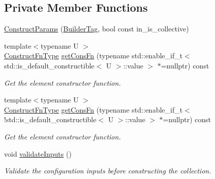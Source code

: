\subsection*{Private Member Functions}
\begin{DoxyCompactItemize}
\item 
\hyperlink{structvt_1_1vrt_1_1collection_1_1param_1_1_construct_params_a41900d135214f06c2d2b4e7c9d9ae1aa}{Construct\+Params} (\hyperlink{structvt_1_1vrt_1_1collection_1_1param_1_1_construct_params_1_1_builder_tag}{Builder\+Tag}, bool const in\+\_\+is\+\_\+collective)
\item 
{\footnotesize template$<$typename U $>$ }\\\hyperlink{structvt_1_1vrt_1_1collection_1_1param_1_1_construct_params_a7ad7bdf4220701e54b485f45e08b1736}{Construct\+Fn\+Type} \hyperlink{structvt_1_1vrt_1_1collection_1_1param_1_1_construct_params_ae6f31177ec60c98d598b6df9eda8d06a}{get\+Cons\+Fn} (typename std\+::enable\+\_\+if\+\_\+t$<$ std\+::is\+\_\+default\+\_\+constructible$<$ U $>$\+::value $>$ $\ast$=nullptr) const
\begin{DoxyCompactList}\small\item\em Get the element constructor function. \end{DoxyCompactList}\item 
{\footnotesize template$<$typename U $>$ }\\\hyperlink{structvt_1_1vrt_1_1collection_1_1param_1_1_construct_params_a7ad7bdf4220701e54b485f45e08b1736}{Construct\+Fn\+Type} \hyperlink{structvt_1_1vrt_1_1collection_1_1param_1_1_construct_params_ab0d89974dff84686c16173b93881c0e8}{get\+Cons\+Fn} (typename std\+::enable\+\_\+if\+\_\+t$<$!std\+::is\+\_\+default\+\_\+constructible$<$ U $>$\+::value $>$ $\ast$=nullptr) const
\begin{DoxyCompactList}\small\item\em Get the element constructor function. \end{DoxyCompactList}\item 
void \hyperlink{structvt_1_1vrt_1_1collection_1_1param_1_1_construct_params_a6290541ab30870daf78af1984ddc164d}{validate\+Inputs} ()
\begin{DoxyCompactList}\small\item\em Validate the configuration inputs before constructing the collection. \end{DoxyCompactList}\end{DoxyCompactItemize}
